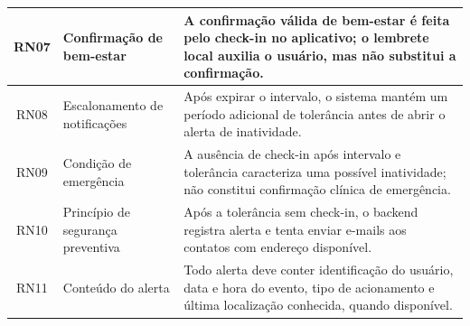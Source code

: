 \begin{table}[H]
\begin{tabular}{|c|p{4cm}|p{8cm}|}
RN07 & Confirmação de bem-estar &
A confirmação válida de bem-estar é feita pelo check-in no aplicativo; o lembrete local auxilia o usuário, mas não substitui a confirmação. \\
\hline

RN08 & Escalonamento de notificações &
Após expirar o intervalo, o sistema mantém um período adicional de tolerância antes de abrir o alerta de inatividade. \\
\hline

RN09 & Condição de emergência &
A ausência de check-in após intervalo e tolerância caracteriza uma possível inatividade; não constitui confirmação clínica de emergência. \\
\hline

RN10 & Princípio de segurança preventiva &
Após a tolerância sem check-in, o backend registra alerta e tenta enviar e-mails aos contatos com endereço disponível. \\
\hline

RN11 & Conteúdo do alerta &
Todo alerta deve conter identificação do usuário, data e hora do evento, tipo de acionamento e última localização conhecida, quando disponível. \\
\hline

\end{tabular}

\end{table}

